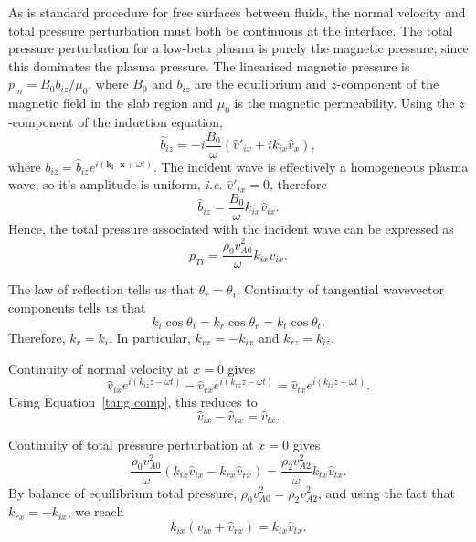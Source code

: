 \documentclass[12pt]{article}
\begin{document}
	As is standard procedure for free surfaces between fluids, the normal velocity and total pressure perturbation must both be continuous at the interface. The total pressure perturbation for a low-beta plasma is purely the magnetic pressure, since this dominates the plasma pressure. The linearised magnetic pressure is $p_m = B_0b_{iz}/\mu_0$, where $B_0$ and $b_{iz}$ are the equilibrium and $z$-component of the magnetic field in the slab region and $\mu_0$ is the magnetic permeability. Using the $z$-component of the induction equation,
	\begin{equation}
	\hat{b}_{iz} = -i\frac{B_0}{\omega} (\hat{v}'_{ix} + ik_{ix}\hat{v}_x),
	\end{equation}
	where $b_{iz} = \hat{b}_{iz} e^{i(\mathbf{k_i}\cdot \mathbf{x} + \omega t)}$. The incident wave is effectively a homogeneous plasma wave, so it's amplitude is uniform, \textit{i.e.} $\hat{v}'_{ix} = 0$, therefore
	\begin{equation}
	\hat{b}_{iz} = \frac{B_0}{\omega} k_{ix}\hat{v}_{ix}.
	\end{equation}
	Hence, the total pressure associated with the incident wave can be expressed as
	\begin{equation}
	p_{Ti} = \frac{\rho_0v_{A0}^2}{\omega}k_{ix}v_{ix}.
	\end{equation}
	
	The law of reflection tells us that $\theta_r = \theta_i$. Continuity of tangential wavevector components tells us that
	\begin{equation}
	k_i\cos{\theta_i} = k_r\cos{\theta_r} = k_t\cos{\theta_t}. \label{tang comp}
	\end{equation}
	Therefore, $k_r = k_i$. In particular, $k_{rx} = -k_{ix}$ and $k_{rz} = k_{iz}$.
	
	Continuity of normal velocity at $x = 0$ gives
	\begin{equation}
	\hat{v}_{ix}e^{i(k_{iz}z - \omega t)} - \hat{v}_{rx}e^{i(k_{rz}z - \omega t)} = \hat{v}_{tx}e^{i(k_{tz}z - \omega t)}.
	\end{equation}
	Using Equation~\eqref{tang comp}, this reduces to
	\begin{equation}
	\hat{v}_{ix} - \hat{v}_{rx} = \hat{v}_{tx}. \label{cont vel}
	\end{equation}
	
	Continuity of total pressure perturbation at $x = 0$ gives
	\begin{equation}
	\frac{\rho_0v_{A0}^2}{\omega}(k_{ix}\hat{v}_{ix} - k_{rx}\hat{v}_{rx}) = \frac{\rho_2v_{A2}^2}{\omega}k_{tx}\hat{v}_{tx}.
	\end{equation}
	By balance of equilibrium total pressure, $\rho_0v_{A0}^2 = \rho_2v_{A2}^2$, and using the fact that $k_{rx} = -k_{ix}$, we reach
	\begin{equation}
	k_{ix}(\hat{v}_{ix} + \hat{v}_{rx}) = k_{tx}\hat{v}_{tx}. \label{cont pressure}
	\end{equation}
	
\end{document}

